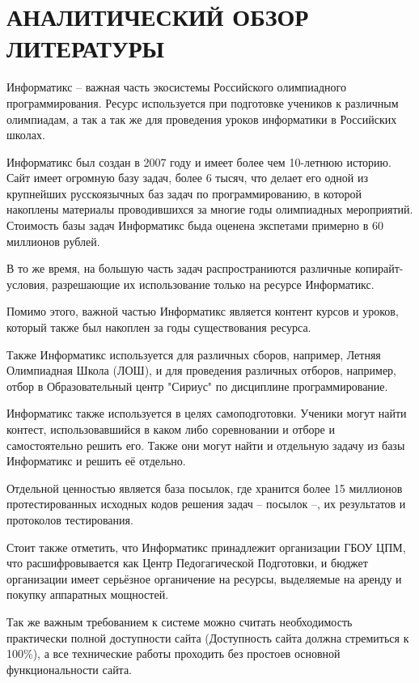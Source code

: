 \chapter{АНАЛИТИЧЕСКИЙ ОБЗОР ЛИТЕРАТУРЫ}

Информатикс -- важная часть экосистемы Российского олимпиадного программирования.
Ресурс используется при подготовке учеников к различным олимпиадам,
а так а так же для проведения уроков информатики в Российских школах.

Информатикс был создан в 2007 году и имеет более чем 10-летнюю историю.
Сайт имеет огромную базу задач, более 6 тысяч, 
что делает его одной из крупнейших русскоязычных баз задач по программированию, в которой накоплены материалы проводившихся за многие годы олимпиадных мероприятий. 
Стоимость базы задач Информатикс быда оценена экспетами примерно в 60 миллионов рублей. 

В то же время, на большую часть задач распространиются различные копирайт-условия, разрешающие их использование только на ресурсе Информатикс.

Помимо этого, важной частью Информатикс является контент курсов и уроков, 
который также был накоплен за годы существования ресурса.

Также Информатикс используется для различных сборов, например, Летняя Олимпиадная Школа (ЛОШ), 
и для проведения различных отборов, например, отбор в Образовательный центр "Сириус" по дисциплине программирование\cite{inf_tinkoff}.

Информатикс также используется в целях самоподготовки.
Ученики могут найти контест, использовавшийся в каком либо соревновании и отборе и самостоятельно решить его.
Также они могут найти и отдельную задачу из базы Информатикс и решить её отдельно.

Отдельной ценностью является база посылок, где хранится более 15 миллионов протестированных исходных кодов решения задач -- посылок --, их результатов и протоколов тестирования. 

Стоит также отметить, что Информатикс принадлежит организации ГБОУ ЦПМ, что расшифровывается как Центр Педогагической Подготовки,
и бюджет организации имеет серьёзное органичение на ресурсы, выделяемые на аренду и покупку аппаратных мощностей.

Так же важным требованием к системе можно считать необходимость практически полной доступности сайта (Доступность сайта должна стремиться к 100\%), 
а все технические работы проходить без простоев основной функциональности сайта.

